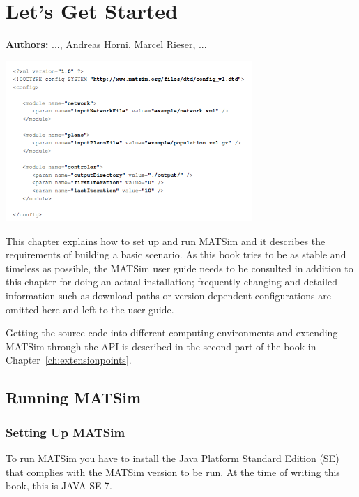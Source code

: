 \chapter{Let's Get Started}
\label{ch:lgstarted}
\hfill \textbf{Authors:} ..., Andreas Horni, Marcel Rieser, ...

\begin{center} \includegraphics[width=0.7\textwidth, angle=0]{using/figures/config.png} \end{center}

This chapter explains how to set up and run MATSim and it describes the requirements of building a basic scenario. As this book tries to be as stable and timeless as possible, the MATSim user guide \citep[][]{MATSim_Userguide_2014} needs to be consulted in addition to this chapter for doing an actual installation; frequently changing and detailed information such as download paths or version-dependent configurations are omitted here and left to the user guide. 

Getting the source code into different computing environments and extending MATSim through the API is described in the second part of the book in Chapter~\ref{ch:extensionpoints}.

\section{Running MATSim}
\label{sec:runningmatsim}
\subsection{Setting Up MATSim}
To run MATSim you have to install the Java Platform Standard Edition (SE) that complies with the MATSim version to be run. At the time of writing this book, this is JAVA SE 7.

